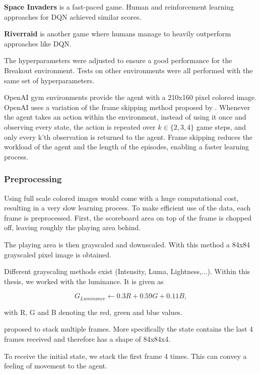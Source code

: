 \textbf{Space Invaders} is a fast-paced game. Human and reinforcement learning approaches for DQN achieved similar scores. \citep{mnih2015atari}

\textbf{Riverraid} is another game where humans manage to heavily outperform approaches like DQN.

The hyperparameters were adjusted to ensure a good performance for the Breakout environment. Tests on other environments were all performed with the same set of hyperparameters.


OpenAI gym environments provide the agent with a 210x160 pixel colored image. \linebreak
OpenAI uses a variation of the frame skipping method proposed by \citet{nature}.
Whenever the agent takes an action within the environment, instead of using it once and observing every state, the action is repeated over $k \in \{2,3,4\}$ game steps, and only every k'th observation is returned to the agent. Frame skipping reduces the workload of the agent and the length of the episodes, enabling a faster learning process.


\subsubsection{Preprocessing}
Using full scale colored images would come with a huge computational cost, resulting in a very slow learning process.
To make efficient use of the data, each frame is preprocessed.
First, the scoreboard area on top of the frame is chopped off, leaving roughly the playing area behind.

The playing area is then grayscaled and downscaled. With this method a 84x84 grayscaled pixel image is obtained.

Different grayscaling methods exist (Intensity, Luma, Lightness,...). Within this thesis, we worked with the luminance. It is given as

\begin{equation}
G_{Luminance} \gets 0.3 R + 0.59 G + 0.11 B,
\end{equation}

with R, G and B denoting the red, green and blue values.

\citet{nature} proposed to stack multiple frames. More specifically the state contains the last 4 frames received and therefore has a shape of 84x84x4.

To receive the initial state, we stack the first frame 4 times.
This can convey a feeling of movement to the agent.


